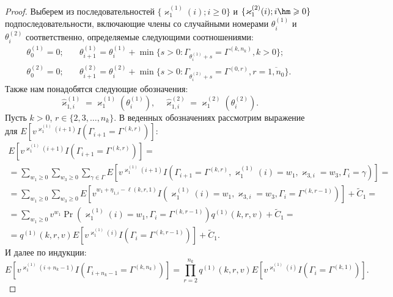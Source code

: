 \begin{proof}
Выберем из последовательностей $\{\varkappa_{1}^{(1)}(i); i\geqslant0\}$ и $\{\varkappa_{1}^{(2)}(i); i \hm\geqslant 0\}$   
 подпоследовательности, включающие члены со случайными номерами $\theta_{i}^{(1)}$ и $\theta_{i}^{(2)}$ соответственно,  определяемые следующими соотношениями:
\begin{equation}
\begin{aligned}
  \theta_{0}^{(1)}=0; & \quad \theta_{i+1}^{(1)}=\theta_{i}^{(1)} + \min{\{s>0\colon \Gamma_{\theta_{i}^{(1)}+s} = \Gamma^{(k,n_k)}, k>0\}};\\
  \theta_{0}^{(2)}=0; & \quad  \theta_{i+1}^{(2)}=\theta_{i}^{(2)} + \min{\{s>0\colon \Gamma_{\theta_{i}^{(2)}+s} = \Gamma^{(0,r)}, r=\overline{1,n_0}\}}.
  \label{stop:times}
\end{aligned}
\end{equation}
Также нам понадобятся следующие обозначения:
\begin{equation}
  \hat{\varkappa}_{1,i}^{(1)}=\varkappa_{1}^{(1)}(\theta_{i}^{(1)}), \quad   \hat{\varkappa}_{1,i}^{(2)}=\varkappa_{1}^{(2)}(\theta_{i}^{(2)}).
  \label{stop:queue}
\end{equation}
Пусть $k>0$, $r \in \{2, 3, \ldots, n_k\}$. В веденных обозначениях рассмотрим выражение для $E[v^{\varkappa_{1}^{(1)}(i+1)} I(\Gamma_{i+1}=\Gamma^{(k,r)})]$:
\begin{multline*}
  E[v^{\varkappa_{1}^{(1)}(i+1)} I(\Gamma_{i+1}=\Gamma^{(k,r)})] = \\ =\sum_{w_1 \geqslant 0} \sum_{w_3 \geqslant 0} \sum_{\gamma \in \Gamma} E[v^{\varkappa_{1}^{(1)}(i+1)} I(\Gamma_{i+1}=\Gamma^{(k,r)}, \varkappa_{1}^{(1)}(i)=w_1, \varkappa_{3,i}=w_3,\Gamma_i=\gamma)] =\\= \sum_{w_1\geqslant 0} \sum_{w_3\geqslant 0} E[v^{w_1 + \eta_{1,i}-\ell(k,r,1)} I(\varkappa_{1}^{(1)}(i)=w_1, \varkappa_{3,i}=w_3,\Gamma_i=\Gamma^{(k,r-1)})] + \widetilde{C}_1=\\
  =\sum_{w_1\geqslant 0} v^{w_1 } \Pr (\varkappa_{1}^{(1)}(i)=w_1, \Gamma_i=\Gamma^{(k,r-1)}) q^{(1)}(k,r,v) + \widetilde{C}_1 = \\
  =q^{(1)}(k,r,v) E[v^{\varkappa_{1}^{(1)}(i)} I(\Gamma_i=\Gamma^{(k,r-1)})] + \widetilde{C}_1.
\end{multline*}
И далее по индукции:
\begin{equation*}
  E[v^{\varkappa_{1}^{(1)}(i+n_k-1)} I(\Gamma_{i+n_k-1}=\Gamma^{(k,n_k)})] = \prod_{r=2}^{n_k} q^{(1)}(k,r,v) E[v^{\varkappa_{1}^{(1)}(i)} I(\Gamma_{i}=\Gamma^{(k,1)})].
\end{equation*}

\end{proof}
